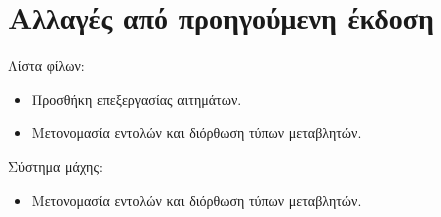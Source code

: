 \section*{Αλλαγές από προηγούμενη έκδοση}

Λίστα φίλων:
\begin{itemize}
\item Προσθήκη επεξεργασίας αιτημάτων.

\item Μετονομασία εντολών και διόρθωση τύπων μεταβλητών.
\end{itemize}


Σύστημα μάχης:
\begin{itemize}
\item Μετονομασία εντολών και διόρθωση τύπων μεταβλητών.
\end{itemize}

\clearpage